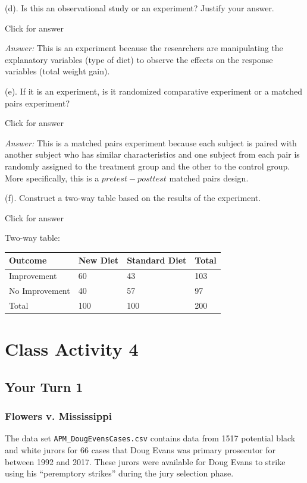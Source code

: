\documentclass[
]{book}
\begin{document}
(d). Is this an observational study or an experiment? Justify your answer.

Click for answer

\emph{Answer:} This is an experiment because the researchers are manipulating the explanatory variables (type of diet) to observe the effects on the response variables (total weight gain).

(e). If it is an experiment, is it randomized comparative experiment or a matched pairs experiment?

Click for answer

\emph{Answer:} This is a matched pairs experiment because each subject is paired with another subject who has similar characteristics and one subject from each pair is randomly assigned to the treatment group and the other to the control group. More specifically, this is a \(pretest - posttest\) matched pairs design.

(f). Construct a two-way table based on the results of the experiment.

Click for answer

Two-way table:

\begin{longtable}[]{@{}llll@{}}
\toprule()
Outcome & New Diet & Standard Diet & Total \\
\midrule()
\endhead
Improvement & 60 & 43 & 103 \\
No Improvement & 40 & 57 & 97 \\
Total & 100 & 100 & 200 \\
\bottomrule()
\end{longtable}

\hypertarget{class-activity-4}{%
\chapter{Class Activity 4}\label{class-activity-4}}

\hypertarget{your-turn-1-2}{%
\section{Your Turn 1}\label{your-turn-1-2}}

\hypertarget{flowers-v.-mississippi}{%
\subsection{Flowers v. Mississippi}\label{flowers-v.-mississippi}}

The data set \texttt{APM\_DougEvensCases.csv} contains data from 1517 potential black and white jurors for 66 cases that Doug Evans was primary prosecutor for between 1992 and 2017. These jurors were available for Doug Evans to strike using his ``peremptory strikes'' during the jury selection phase.
\end{document}
